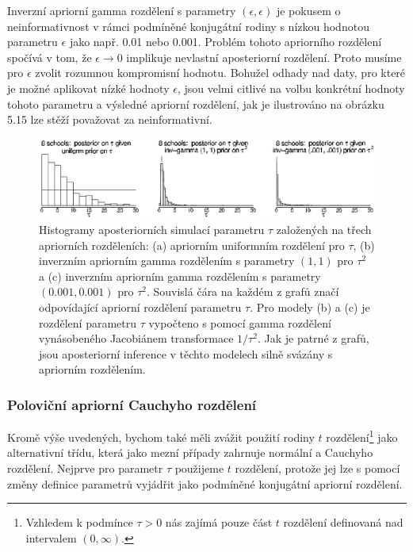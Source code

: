 Inverzní apriorní gamma rozdělení s parametry $(\epsilon, \epsilon)$ je pokusem o neinformativnost v rámci podmíněné konjugátní rodiny s nízkou hodnotou parametru $\epsilon$ jako např. 0.01 nebo 0.001. Problém tohoto apriorního rozdělení spočívá v tom, že $\epsilon \rightarrow 0$ implikuje nevlastní aposteriorní rozdělení. Proto musíme pro $\epsilon$ zvolit rozumnou kompromisní hodnotu. Bohužel odhady nad daty, pro které je možné aplikovat nízké hodnoty $\epsilon$, jsou velmi citlivé na volbu konkrétní hodnoty tohoto parametru a výsledné apriorní rozdělení, jak je ilustrováno na obrázku 5.15 lze stěží považovat za neinformativní.
\begin{figure}[htp]
\centering
\includegraphics[scale = 0.42]{pictures/fig_5_9.eps}
\caption{Histogramy aposteriorních simulací parametru $\tau$ založených na třech apriorních rozděleních: (a) apriorním uniformním rozdělení pro $\tau$, (b) inverzním apriorním gamma rozdělením s parametry $(1, 1)$ pro $\tau^2$ a (c) inverzním apriorním gamma rozdělením s parametry $(0.001, 0.001)$ pro $\tau^2$. Souvislá čára na každém z grafů značí odpovídající apriorní rozdělení parametru $\tau$. Pro modely (b) a (c) je rozdělení parametru $\tau$ vypočteno s pomocí gamma rozdělení vynásobeného Jacobiánem transformace $1/\tau^2$. Jak je patrné z grafů, jsou aposteriorní inference v těchto modelech silně svázány s apriorním rozdělením.}
\label{fig_5_9}
\end{figure}

\subsubsection{Poloviční apriorní Cauchyho rozdělení}

Kromě výše uvedených, bychom také měli zvážit použití rodiny $t$ rozdělení\footnote{Vzhledem k podmínce $\tau > 0$ nás zajímá pouze část $t$ rozdělení definovaná nad intervalem $(0, \infty)$.} jako alternativní třídu, která jako mezní případy zahrnuje normální a Cauchyho rozdělení. Nejprve pro parametr $\tau$ použijeme $t$ rozdělení, protože jej lze s pomocí změny definice parametrů vyjádřit jako podmíněné konjugátní apriorní rozdělení.

